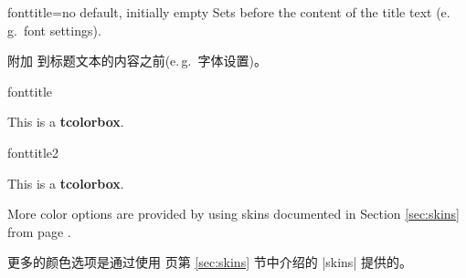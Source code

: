 \begin{docTcbKey}{fonttitle}{=}{no default, initially empty}
Sets  before the content of the title text (e.\,g.\ font settings).

附加  到标题文本的内容之前(e.\,g.\ 字体设置)。
\begin{exdispExample}{fonttitle}
\begin{tcolorbox}[fonttitle=\sffamily\bfseries\large,title=Hello]
This is a \textbf{tcolorbox}.
\end{tcolorbox}
\end{exdispExample}
\begin{exdispExample}{fonttitle2}
\begin{tcolorbox}[fonttitle=只加了文字,title=Hello]
This is a \textbf{tcolorbox}.
\end{tcolorbox}
\end{exdispExample}
\end{docTcbKey}

\bigskip
\begin{marker}
More color options are provided by using skins documented in
Section \ref{sec:skins} from page \pageref{sec:skins}.

更多的颜色选项是通过使用 \pageref{sec:skins} 页第 \ref{sec:skins} 节中介绍的 |skins| 提供的。
\end{marker}